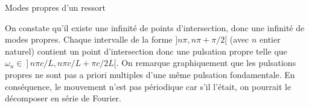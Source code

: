 \begin{exo}[PC][1][devoir]{Modes propres d'un ressort}
\begin{quest}
{  On constate qu'il existe une infinité de points d'intersection, donc une infinité de modes propres. Chaque intervalle de la forme $]n \pi, n \pi+\pi/2[$ (avec $n$ entier naturel) contient un point d'intersection donc une pulsation propre telle que $\left.\omega_n \in\right] n \pi c / L, n \pi c / L+\pi c / 2 L[$.
On remarque graphiquement que les pulsations propres ne sont pas a priori multiples d'une même pulsation fondamentale. En conséquence, le mouvement n'est pas périodique car s'il l'était, on pourrait le décomposer en série de Fourier.
  }
\end{quest}

\end{exo}

